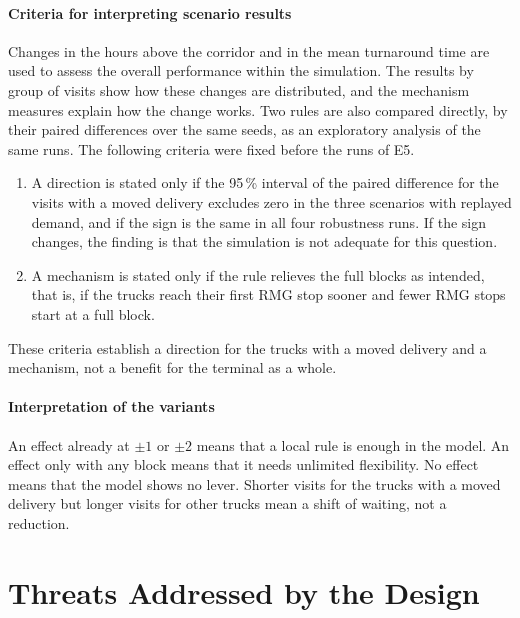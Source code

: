\paragraph{Criteria for interpreting scenario results}
Changes in the hours above the corridor and in the mean turnaround time are used to
assess the overall performance within the simulation. The results by group of visits
show how these changes are distributed, and the mechanism measures explain how the
change works. Two rules are also compared directly, by their paired differences over
the same seeds, as an exploratory analysis of the same runs. The following criteria
were fixed before the runs of E5.
\begin{enumerate}
\item A direction is stated only if the 95\,\% interval of the paired difference
for the visits with a moved delivery excludes zero in the three scenarios with
replayed demand, and if the sign is the same in all four robustness runs. If the
sign changes, the finding is that the simulation is not adequate for this question.
\item A mechanism is stated only if the rule relieves the full blocks as intended,
that is, if the trucks reach their first RMG stop sooner and fewer RMG stops start
at a full block.
\end{enumerate}
These criteria establish a direction for the trucks with a moved delivery and a
mechanism, not a benefit for the terminal as a whole.

\paragraph{Interpretation of the variants} An effect already at $\pm 1$ or $\pm 2$
means that a local rule is enough in the model. An effect only with any block means
that it needs unlimited flexibility. No effect means that the model shows no lever.
Shorter visits for the trucks with a moved delivery but longer visits for other
trucks mean a shift of waiting, not a reduction.

\section{Threats Addressed by the Design}
\label{sec:exp_threats}

